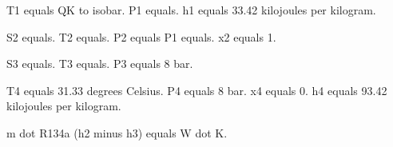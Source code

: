 T1 equals QK to isobar.  
P1 equals.  
h1 equals 33.42 kilojoules per kilogram.  

S2 equals.  
T2 equals.  
P2 equals P1 equals.  
x2 equals 1.  

S3 equals.  
T3 equals.  
P3 equals 8 bar.  

T4 equals 31.33 degrees Celsius.  
P4 equals 8 bar.  
x4 equals 0.  
h4 equals 93.42 kilojoules per kilogram.  

m dot R134a (h2 minus h3) equals W dot K.